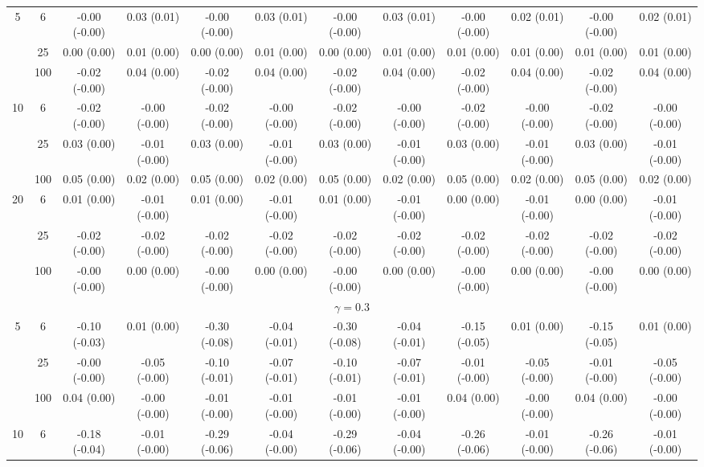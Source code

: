 \documentclass[
  man]{apa6}
\newenvironment{lltable}{\begin{landscape}\centering\begin{ThreePartTable}}{\end{ThreePartTable}\end{landscape}}
\begin{document}
\begin{lltable}
{\begin{longtable}{cccccccccccc}
5 & 6 & -0.00 (-0.00) & 0.03 (0.01) & -0.00 (-0.00) & 0.03 (0.01) & -0.00 (-0.00) & 0.03 (0.01) & -0.00 (-0.00) & 0.02 (0.01) & -0.00 (-0.00) & 0.02 (0.01)\\
 & 25 & 0.00 (0.00) & 0.01 (0.00) & 0.00 (0.00) & 0.01 (0.00) & 0.00 (0.00) & 0.01 (0.00) & 0.01 (0.00) & 0.01 (0.00) & 0.01 (0.00) & 0.01 (0.00)\\
 & 100 & -0.02 (-0.00) & 0.04 (0.00) & -0.02 (-0.00) & 0.04 (0.00) & -0.02 (-0.00) & 0.04 (0.00) & -0.02 (-0.00) & 0.04 (0.00) & -0.02 (-0.00) & 0.04 (0.00)\\
10 & 6 & -0.02 (-0.00) & -0.00 (-0.00) & -0.02 (-0.00) & -0.00 (-0.00) & -0.02 (-0.00) & -0.00 (-0.00) & -0.02 (-0.00) & -0.00 (-0.00) & -0.02 (-0.00) & -0.00 (-0.00)\\
 & 25 & 0.03 (0.00) & -0.01 (-0.00) & 0.03 (0.00) & -0.01 (-0.00) & 0.03 (0.00) & -0.01 (-0.00) & 0.03 (0.00) & -0.01 (-0.00) & 0.03 (0.00) & -0.01 (-0.00)\\
 & 100 & 0.05 (0.00) & 0.02 (0.00) & 0.05 (0.00) & 0.02 (0.00) & 0.05 (0.00) & 0.02 (0.00) & 0.05 (0.00) & 0.02 (0.00) & 0.05 (0.00) & 0.02 (0.00)\\
20 & 6 & 0.01 (0.00) & -0.01 (-0.00) & 0.01 (0.00) & -0.01 (-0.00) & 0.01 (0.00) & -0.01 (-0.00) & 0.00 (0.00) & -0.01 (-0.00) & 0.00 (0.00) & -0.01 (-0.00)\\
 & 25 & -0.02 (-0.00) & -0.02 (-0.00) & -0.02 (-0.00) & -0.02 (-0.00) & -0.02 (-0.00) & -0.02 (-0.00) & -0.02 (-0.00) & -0.02 (-0.00) & -0.02 (-0.00) & -0.02 (-0.00)\\
 & 100 & -0.00 (-0.00) & 0.00 (0.00) & -0.00 (-0.00) & 0.00 (0.00) & -0.00 (-0.00) & 0.00 (0.00) & -0.00 (-0.00) & 0.00 (0.00) & -0.00 (-0.00) & 0.00 (0.00)\\
\multicolumn{12}{c}{$\gamma = 0.3$}\\
5 & 6 & -0.10 (-0.03) & 0.01 (0.00) & -0.30 (-0.08) & -0.04 (-0.01) & -0.30 (-0.08) & -0.04 (-0.01) & -0.15 (-0.05) & 0.01 (0.00) & -0.15 (-0.05) & 0.01 (0.00)\\
 & 25 & -0.00 (-0.00) & -0.05 (-0.00) & -0.10 (-0.01) & -0.07 (-0.01) & -0.10 (-0.01) & -0.07 (-0.01) & -0.01 (-0.00) & -0.05 (-0.00) & -0.01 (-0.00) & -0.05 (-0.00)\\
 & 100 & 0.04 (0.00) & -0.00 (-0.00) & -0.01 (-0.00) & -0.01 (-0.00) & -0.01 (-0.00) & -0.01 (-0.00) & 0.04 (0.00) & -0.00 (-0.00) & 0.04 (0.00) & -0.00 (-0.00)\\
10 & 6 & -0.18 (-0.04) & -0.01 (-0.00) & -0.29 (-0.06) & -0.04 (-0.00) & -0.29 (-0.06) & -0.04 (-0.00) & -0.26 (-0.06) & -0.01 (-0.00) & -0.26 (-0.06) & -0.01 (-0.00)\\

\end{longtable}}
\end{lltable}
\end{document}
